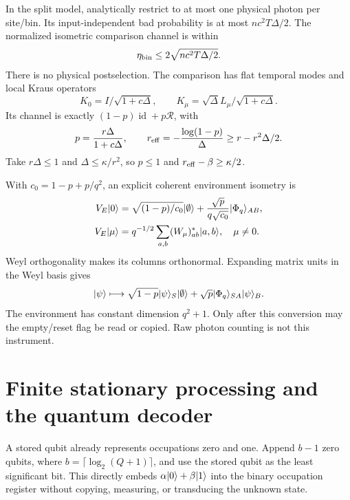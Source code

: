 \documentclass[11pt,a4paper]{article}
\newcommand{\id}{\operatorname{id}}\newcommand{\Tr}{\operatorname{Tr}}\newcommand{\osc}{\operatorname{osc}}
\begin{document}
In the split model, analytically restrict to at most one physical photon per site/bin. Its input-independent bad probability is at most $nc^2T\Delta/2$. The normalized isometric comparison channel is within
\begin{equation}
 \eta_{\rm bin}\le2\sqrt{nc^2T\Delta/2}.
 \label{eq:onebin}
\end{equation}
There is no physical postselection. The comparison has flat temporal modes and local Kraus operators
\begin{equation}
 K_0=I/\sqrt{1+c\Delta},\qquad K_\mu=\sqrt\Delta L_\mu/\sqrt{1+c\Delta}.
\end{equation}
Its channel is exactly $(1-p)\id+p\mathcal R$, with
\begin{equation}
 p=\frac{r\Delta}{1+c\Delta},\qquad
 r_{\rm eff}=-\frac{\log(1-p)}{\Delta}\ge r-r^2\Delta/2.
 \label{eq:reff}
\end{equation}
Take $r\Delta\le1$ and $\Delta\le\kappa/r^2$, so $p\le1$ and $r_{\rm eff}-\beta\ge\kappa/2$.

With $c_0=1-p+p/q^2$, an explicit coherent environment isometry is
\begin{align}
 V_E\lvert 0\rangle&=\sqrt{(1-p)/c_0}\lvert \emptyset\rangle
              +\frac{\sqrt p}{q\sqrt{c_0}}\lvert \Phi_q\rangle_{AB},\\
 V_E\lvert \mu\rangle&=q^{-1/2}\sum_{a,b}(W_\mu)_{ab}^*\lvert a,b\rangle,\quad\mu\ne0.
 \label{eq:krausiso}
\end{align}
Weyl orthogonality makes its columns orthonormal. Expanding matrix units in the Weyl basis gives
\begin{equation}
 \lvert \psi\rangle\longmapsto
 \sqrt{1-p}\lvert \psi\rangle_S\lvert \emptyset\rangle
 +\sqrt p\lvert \Phi_q\rangle_{SA}\lvert \psi\rangle_B.
 \label{eq:reset}
\end{equation}
The environment has constant dimension $q^2+1$. Only after this conversion may the empty/reset flag be read or copied. Raw photon counting is not this instrument.

\section{Finite stationary processing and the quantum decoder}
\label{sec:digital}

A stored qubit already represents occupations zero and one. Append $b-1$ zero qubits, where $b=\lceil\log_2(Q+1)\rceil$, and use the stored qubit as the least significant bit. This directly embeds $\alpha\lvert 0\rangle+\beta\lvert 1\rangle$ into the binary occupation register without copying, measuring, or transducing the unknown state.
\end{document}
